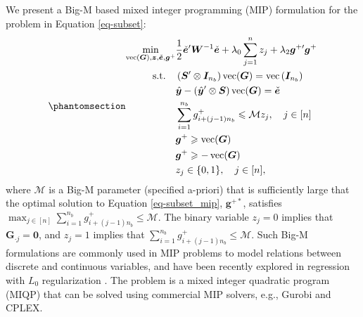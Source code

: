 \documentclass[
  11pt]{article}
\theoremstyle{plain}
\theoremstyle{remark}
\begin{document}
We present a Big-M based mixed integer programming (MIP) formulation for
the problem in Equation \eqref{eq-subset}:
\begin{equation}\phantomsection\label{eq-subset_mip}{
\begin{aligned}
\min_{\operatorname{vec}(\bm{G}), \bm{z}, \check{\bm{e}}, \bm{g}^{+}} & \frac{1}{2}\check{\bm{e}}^{\prime} \bm{W}^{-1}\check{\bm{e}} + \lambda_0 \sum_{j=1}^n z_j + \lambda_2 \bm{g}^{+\prime}\bm{g}^{+} \\
\text{s.t.} \quad & \left(\bm{S}^{\prime} \otimes \bm{I}_{n_b}\right) \operatorname{vec}(\bm{G})=\operatorname{vec}\left(\bm{I}_{n_b}\right) \\
& \hat{\bm{y}}-\left(\hat{\bm{y}}^{\prime} \otimes \bm{S}\right)\operatorname{vec}(\bm{G}) = \check{\bm{e}} \\
& \sum_{i=1}^{n_b} g_{i + (j-1) n_b}^{+} \leqslant \mathcal{M} z_j, \quad j \in[n] \\
& \bm{g}^{+} \geqslant \operatorname{vec}(\bm{G}) \\
& \bm{g}^{+} \geqslant-\operatorname{vec}(\bm{G}) \\
& z_j \in\{0,1\}, \quad j \in[n],
\end{aligned}
}\end{equation} where \(\mathcal{M}\) is a Big-M parameter (specified
a-priori) that is sufficiently large that the optimal solution to
Equation \eqref{eq-subset_mip}, \(\bm{g}^{+*}\), satisfies
\(\max_{j \in [n]}\sum_{i=1}^{n_b} g_{i + (j-1) n_b}^{+} \leqslant \mathcal{M}\).
The binary variable \(z_j=0\) implies that \(\bm{G}_{\cdot j}=\bm{0}\),
and \(z_j=1\) implies that
\(\sum_{i=1}^{n_b} g_{i + (j-1) n_b}^{+} \leqslant \mathcal{M}\). Such
Big-M formulations are commonly used in MIP problems to model relations
between discrete and continuous variables, and have been recently
explored in regression with \(L_0\) regularization
\citep{Bertsimas2016-ig}. The problem is a mixed integer quadratic
program (MIQP) that can be solved using commercial MIP solvers, e.g.,
Gurobi and CPLEX.
\end{document}
